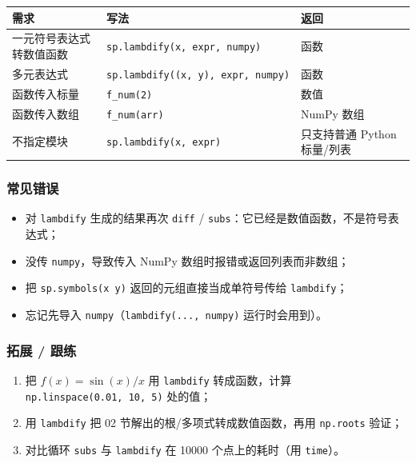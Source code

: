 {\def\LTcaptype{none} %
\begin{longtable}[]{@{}lll@{}}
\toprule\noalign{}
需求 & 写法 & 返回 \\
\midrule\noalign{}
\endhead
\bottomrule\noalign{}
\endlastfoot
一元符号表达式转数值函数 &
\texttt{sp.lambdify(x,\ expr,\ \textquotesingle{}numpy\textquotesingle{})}
& 函数 \\
多元表达式 &
\texttt{sp.lambdify((x,\ y),\ expr,\ \textquotesingle{}numpy\textquotesingle{})}
& 函数 \\
函数传入标量 & \texttt{f\_num(2)} & 数值 \\
函数传入数组 & \texttt{f\_num(arr)} & NumPy 数组 \\
不指定模块 & \texttt{sp.lambdify(x,\ expr)} & 只支持普通 Python
标量/列表 \\
\end{longtable}
}

\subsubsection{常见错误}\label{ux5e38ux89c1ux9519ux8bef-13}

\begin{itemize}
\tightlist
\item
  对 \texttt{lambdify} 生成的结果再次 \texttt{diff} /
  \texttt{subs}：它已经是数值函数，不是符号表达式；
\item
  没传 \texttt{\textquotesingle{}numpy\textquotesingle{}}，导致传入
  NumPy 数组时报错或返回列表而非数组；
\item
  把 \texttt{sp.symbols(\textquotesingle{}x\ y\textquotesingle{})}
  返回的元组直接当成单符号传给 \texttt{lambdify}；
\item
  忘记先导入
  \texttt{numpy}（\texttt{lambdify(...,\ \textquotesingle{}numpy\textquotesingle{})}
  运行时会用到）。
\end{itemize}

\subsubsection{拓展 / 跟练}\label{ux62d3ux5c55-ux8ddfux7ec3-2}

\begin{enumerate}
\def\labelenumi{\arabic{enumi}.}
\tightlist
\item
  把 \(f(x)=\sin(x)/x\) 用 \texttt{lambdify} 转成函数，计算
  \texttt{np.linspace(0.01,\ 10,\ 5)} 处的值；
\item
  用 \texttt{lambdify} 把 02 节解出的根/多项式转成数值函数，再用
  \texttt{np.roots} 验证；
\item
  对比循环 \texttt{subs} 与 \texttt{lambdify} 在 10000 个点上的耗时（用
  \texttt{time}）。
\end{enumerate}

